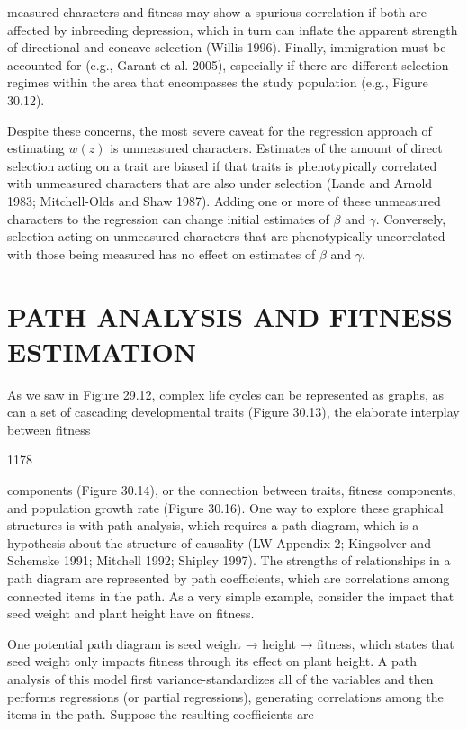 \documentclass{article}
\begin{document}
measured characters and fitness may show a spurious correlation if both are affected by inbreeding depression, which in turn can inflate the apparent strength of directional and concave selection (Willis 1996). Finally, immigration must be accounted for (e.g., Garant et al. 2005), especially if there are different selection regimes within the area that encompasses the study population (e.g., Figure 30.12).

Despite these concerns, the most severe caveat for the regression approach of estimating  $ w(z) $ is unmeasured characters. Estimates of the amount of direct selection acting on a trait are biased if that traits is phenotypically correlated with unmeasured characters that are also under selection (Lande and Arnold 1983; Mitchell-Olds and Shaw 1987). Adding one or more of these unmeasured characters to the regression can change initial estimates of  $ \beta $ and  $ \gamma $. Conversely, selection acting on unmeasured characters that are phenotypically uncorrelated with those being measured has no effect on estimates of  $ \beta $ and  $ \gamma $.

\section{PATH ANALYSIS AND FITNESS ESTIMATION}
As we saw in Figure 29.12, complex life cycles can be represented as graphs, as can a set of cascading developmental traits (Figure 30.13), the elaborate interplay between fitness

1178

components (Figure 30.14), or the connection between traits, fitness components, and population growth rate (Figure 30.16). One way to explore these graphical structures is with path analysis, which requires a path diagram, which is a hypothesis about the structure of causality (LW Appendix 2; Kingsolver and Schemske 1991; Mitchell 1992; Shipley 1997). The strengths of relationships in a path diagram are represented by path coefficients, which are correlations among connected items in the path. As a very simple example, consider the impact that seed weight and plant height have on fitness.

One potential path diagram is seed weight → height → fitness, which states that seed weight only impacts fitness through its effect on plant height. A path analysis of this model first variance-standardizes all of the variables and then performs regressions (or partial regressions), generating correlations among the items in the path. Suppose the resulting coefficients are
\end{document}
